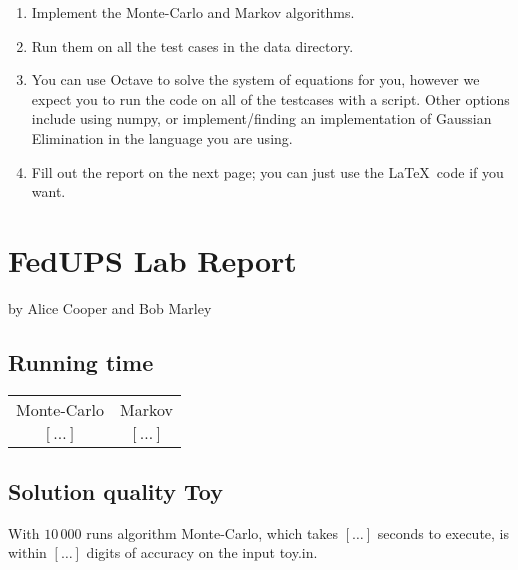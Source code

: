\documentclass{tufte-handout}
\begin{document}
\begin{enumerate}
\item Implement the Monte-Carlo and Markov algorithms.
\item Run them on all the test cases in the data directory.
\item You can use Octave to solve the system of equations for you, 
    however we expect you to run the code on all of the testcases with a script.
    Other options include using numpy, or implement/finding an implementation of
        Gaussian Elimination in the language you are using.
\item Fill out the report on the next page; you can just use the
  \LaTeX\ code if you want.
\end{enumerate}

\newpage


\newpage
\section{FedUPS Lab Report}


by Alice Cooper and Bob Marley

\subsection{Running time}

\begin{tabular}{ c c }
    Monte-Carlo & Markov \\ 
    $[\ldots]$ & $[\ldots]$  
\end{tabular}




\subsection{Solution quality Toy}

With $10\,000$ runs algorithm Monte-Carlo, which takes $[\ldots]$ seconds to execute, is within $[\ldots]$ digits
of accuracy on the input toy.in.
\end{document}

